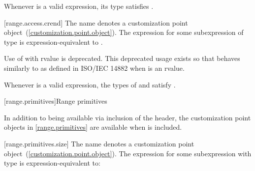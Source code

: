 \pnum
\enternote Whenever  is a valid expression, its
type satisfies . \exitnote

[range.access.crend]{}
\pnum
The name  denotes a customization point
object~(\ref{customization.point.object}). The expression
 for some subexpression  of type 
is expression-equivalent to .

\pnum
Use of  with rvalue  is deprecated.
\enternote This deprecated usage exists so that 
behaves similarly to  as defined in ISO/IEC 14882 when
 is an rvalue. \exitnote

\pnum
\enternote Whenever  is a valid expression, the
types of  and  satisfy
. \exitnote

[range.primitives]{Range primitives}

\pnum
In addition to being available via inclusion of the 
header, the customization point objects in \ref{range.primitives} are
available when  is included.

[range.primitives.size]{}
\pnum
The name  denotes a customization point
object~(\ref{customization.point.object}). The expression
 for some subexpression  with type
 is expression-equivalent to:

